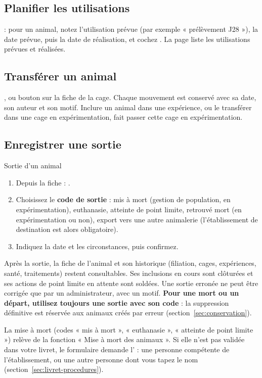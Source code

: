 \documentclass[11pt,a4paper]{article}
\begin{document}
\subsection{Planifier les utilisations}
 : pour un animal, notez
l'utilisation prévue (par exemple « prélèvement J28 »), la date prévue, puis la
date de réalisation, et cochez . La page liste les utilisations
prévues et réalisées.

\subsection{Transférer un animal}
, ou bouton  sur
la fiche de la cage. Chaque mouvement est conservé avec sa date, son auteur
et son motif. Inclure un animal dans une expérience, ou le transférer dans
une cage en expérimentation, fait passer cette cage en expérimentation.

\subsection{Enregistrer une sortie}
\begin{procedure}{Sortie d'un animal}
\begin{enumerate}
  \item Depuis la fiche : .
  \item Choisissez le \textbf{code de sortie} : mis à mort (gestion de
    population, en expérimentation), euthanasie, atteinte de point limite,
    retrouvé mort (en expérimentation ou non), export vers une autre
    animalerie (l'établissement de destination est alors obligatoire).
  \item Indiquez la date et les circonstances, puis confirmez.
\end{enumerate}
\end{procedure}
Après la sortie, la fiche de l'animal et son historique (filiation, cages,
expériences, santé, traitements) restent consultables. Ses inclusions en
cours sont clôturées et ses actions de point limite en attente sont soldées.
Une sortie erronée ne peut être corrigée que par un administrateur, avec un
motif. \textbf{Pour une mort ou un départ, utilisez toujours une sortie avec
son code} : la suppression définitive est réservée aux animaux créés par
erreur (section~\ref{sec:conservation}).
\begin{regle}
La mise à mort (codes « mis à mort », « euthanasie », « atteinte de point
limite ») relève de la fonction « Mise à mort des animaux ». Si elle n'est
pas validée dans votre livret, le formulaire demande l' : une personne compétente de l'établissement, ou une autre personne
dont vous tapez le nom (section~\ref{sec:livret-procedures}).
\end{regle}
\end{document}
